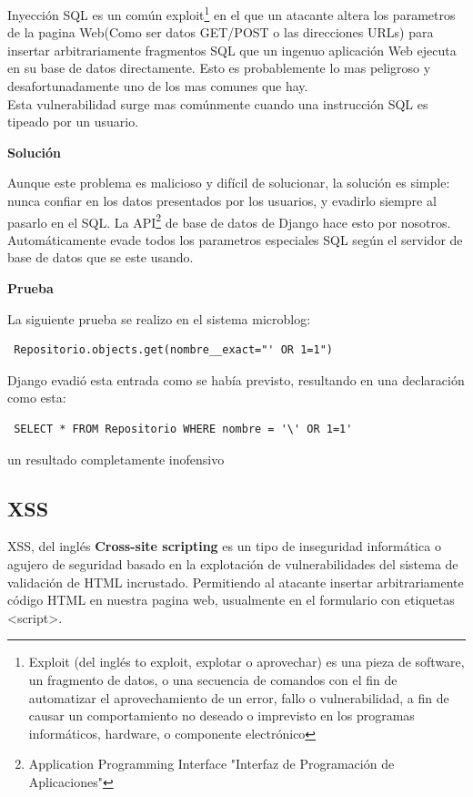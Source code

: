 Inyección SQL es un común exploit\footnote{Exploit (del inglés to exploit, explotar o aprovechar) es una pieza de software, un fragmento de datos, o una secuencia de comandos con el fin de automatizar el aprovechamiento de un error, fallo o vulnerabilidad, a fin de causar un comportamiento no deseado o imprevisto en los programas informáticos, hardware, o componente electrónico} en el que un atacante altera los parametros de la pagina Web(Como ser datos GET/POST o las direcciones URLs) para insertar arbitrariamente fragmentos SQL que un ingenuo aplicación Web ejecuta en su base de datos directamente. Esto es probablemente lo mas peligroso y desafortunadamente uno de los mas comunes que hay.\\
Esta vulnerabilidad surge mas comúnmente cuando una instrucción SQL es tipeado por un usuario.

\textbf{Solución}

Aunque este problema es malicioso y difícil de solucionar, la solución es simple: nunca confiar en los datos presentados por los usuarios, y evadirlo siempre al pasarlo en el SQL.
La API\footnote{Application Programming Interface "Interfaz de Programación de Aplicaciones"} de base de datos de Django hace esto por nosotros. Automáticamente evade todos los parametros especiales SQL según el servidor de base de datos que se este usando.

\textbf{Prueba}

La siguiente prueba se realizo en el sistema microblog:

\begin{verbatim}
 Repositorio.objects.get(nombre__exact="' OR 1=1")
\end{verbatim}

Django evadió esta entrada como se había previsto, resultando en una declaración como esta:

\begin{verbatim}
 SELECT * FROM Repositorio WHERE nombre = '\' OR 1=1'
\end{verbatim}

un resultado completamente inofensivo 

\subsection{XSS}

XSS, del inglés \textbf{Cross-site scripting} es un tipo de inseguridad informática o agujero de seguridad basado en la explotación de vulnerabilidades del sistema de validación de HTML incrustado. Permitiendo al atacante insertar arbitrariamente código HTML en nuestra pagina web, usualmente en el formulario con etiquetas <script>.

